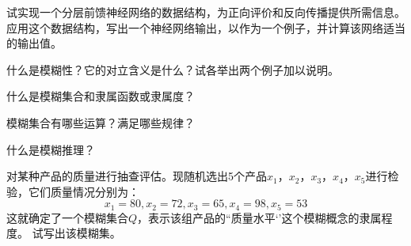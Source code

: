 \begin{question}
试实现一个分层前馈神经网络的数据结构，为正向评价和反向传播提供所需信息。应用这个数据结构，写出一个神经网络输出，以作为一个例子，并计算该网络适当的输出值。
\end{question}
\begin{solution}
\end{solution}

\begin{question}
什么是模糊性？它的对立含义是什么？试各举出两个例子加以说明。
\end{question}
\begin{solution}
\end{solution}

\begin{question}
什么是模糊集合和隶属函数或隶属度？
\end{question}
\begin{solution}
\end{solution}

\begin{question}
模糊集合有哪些运算？满足哪些规律？
\end{question}
\begin{solution}
\end{solution}

\begin{question}
什么是模糊推理？
\end{question}
\begin{solution}
\end{solution}

\begin{question}
对某种产品的质量进行抽查评估。现随机选出5个产品$x_1$，$x_2$，$x_3$，$x_4$，$x_5$进行检验，它们质量情况分别为：
\[ x_1=80, x_2=72, x_3=65, x_4=98, x_5=53\]
这就确定了一个模糊集合$Q$，表示该组产品的``质量水平‘’这个模糊概念的隶属程度。
试写出该模糊集。
\end{question}
\begin{solution}
\end{solution}

